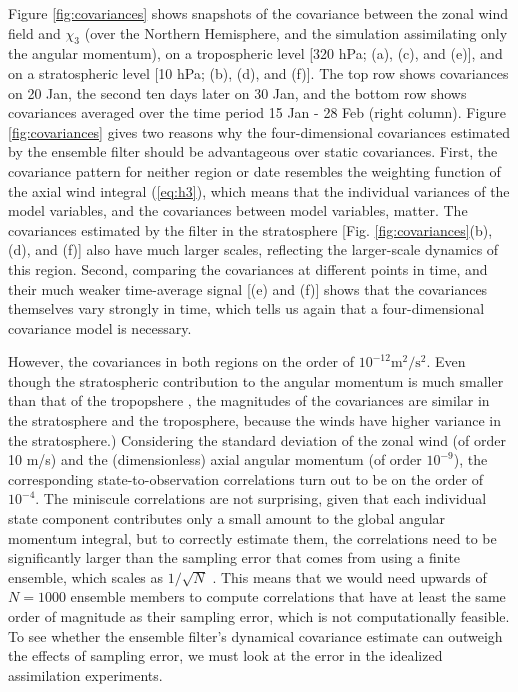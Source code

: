 Figure \ref{fig:covariances} shows snapshots of the covariance between the zonal wind field and $\chi_3$ (over the Northern Hemisphere, and the simulation assimilating only the angular momentum), on a tropospheric level [320 hPa; (a), (c), and (e)], and on a stratospheric level [10 hPa; (b), (d), and (f)].
The top row shows covariances on 20 Jan, the second ten days later on 30 Jan, and the bottom row shows covariances averaged over the time period 15 Jan - 28 Feb (right column).
Figure \ref{fig:covariances} gives two reasons why the four-dimensional covariances estimated by the ensemble filter should be advantageous over static covariances. 
First, the covariance pattern for neither region or date resembles the weighting function of the axial wind integral (\ref{eq:h3}), which means that the individual variances of the model variables, and the covariances between model variables, matter. 
The covariances estimated by the filter in the stratosphere [Fig. \ref{fig:covariances}(b),(d), and (f)] also have much larger scales, reflecting the larger-scale dynamics of this region. 
Second, comparing the covariances at different points in time, and their 
much weaker time-average signal [(e) and (f)] shows that the covariances themselves vary strongly in time, which tells us again that a four-dimensional covariance model is necessary. 

However, the covariances in both regions on the order of $10^{-12}\text{m}^2/\text{s}^2$.  
Even though the stratospheric contribution to the angular momentum is much smaller than that of the tropopshere \citep{Rosen1985,Zhou2008}, 
the magnitudes of the covariances are similar in the stratosphere and the troposphere, because the winds have higher variance in the stratosphere.) 
Considering the standard deviation of the zonal wind (of order 10 m/s) and the (dimensionless) axial angular momentum (of order $10^{-9}$), the corresponding state-to-observation correlations turn out to be on the order of $10^{-4}$. 
The miniscule correlations are not surprising, given that each individual state component contributes only a small amount to the global angular momentum integral, but to 
correctly estimate them, the correlations need to be significantly larger than the sampling error that comes from using a finite ensemble, which 
scales as $1/\sqrt{N}$ \citep{Houtekamer1998}. 
This means that we would need upwards of $N=1000$ ensemble members to compute correlations that have at least the same order of magnitude as their sampling error, which is not computationally feasible. 
To see whether the ensemble filter's dynamical covariance estimate can outweigh the effects of sampling error, we must look at the error in the idealized assimilation experiments. 

